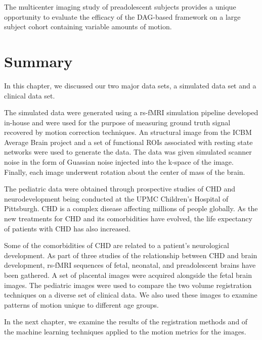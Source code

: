 The multicenter imaging study of preadolescent subjects provides a unique opportunity to evaluate the efficacy of the DAG-based framework on a large subject cohort containing variable amounts of motion. %

\section{Summary}

In this chapter, we discussed our two major data sets, a simulated data set and a clinical data set. 

The simulated data were generated using a rs-fMRI simulation pipeline developed in-house and were used for the purpose of measuring ground truth signal recovered by motion correction techniques. An structural image from the ICBM Average Brain project and a set of functional ROIs associated with resting state networks were used to generate the data. The data was given simulated scanner noise in the form of Guassian noise injected into the k-space of the image. Finally, each image underwent rotation about the center of mass of the brain.

The pediatric data were obtained through prospective studies of CHD and neurodevelopment being conducted at the UPMC Children's Hospital of Pittsburgh. CHD is a complex disease affecting millions of people globally. As the new treatments for CHD and its comorbidities have evolved, the life expectancy of patients with CHD has also increased. 

Some of the comorbidities of CHD are related to a patient's neurological development. As part of three studies of the relationship between CHD and brain development, rs-fMRI sequences of fetal, neonatal, and preadolescent brains have been gathered. A set of placental images were acquired alongside the fetal brain images. The pediatric images were used to compare the two volume registration techniques on a diverse set of clinical data. We also used these images to examine patterns of motion unique to different age groups. 


In the next chapter, we examine the results of the registration methods and of the machine learning techniques applied to the motion metrics for the images.